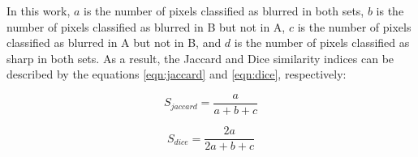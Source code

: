In this work, $a$ is the number of pixels classified as blurred in both sets, $b$ is the number of pixels classified as blurred in B but not in A, $c$ is the number of pixels classified as blurred in A but not in B, and $d$ is the number of pixels classified as sharp in both sets. As a result, the Jaccard and Dice similarity indices can be described by the equations \ref{eqn:jaccard} and \ref{eqn:dice}, respectively:

\begin{equation}
\label{eqn:jaccard}
	S_{jaccard} = \frac{a}{a + b + c}
\end{equation}

\begin{equation}
\label{eqn:dice}
	S_{dice} = \frac{2a}{2a + b + c}
\end{equation}